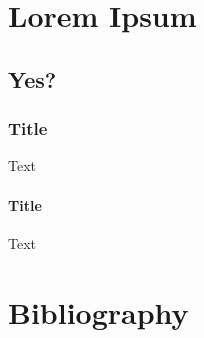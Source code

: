 \documentclass{uob-thesis}
\begin{document}
\chapter{Lorem Ipsum}

\lipsum[1-2]
\parencite{qian2021}
\lipsum[2-13]
\textcite{qian2021}

\section{Yes?}

\lipsum[13-16]
\subsection{Title}
Text
\subsubsection{Title}
Text


\backmatter

\chapter{Bibliography}

\printbibliography[heading=none]
\end{document}
